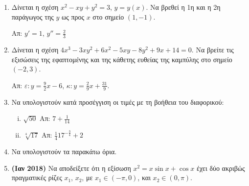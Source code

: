 \begin{enumerate}
\item Δίνεται η σχέση $ x^{2} - xy + y^{2} = 3 $, $ y=y(x) $. Να βρεθεί η 1η
  και η 2η παράγωγος της $y$ ως προς $x$ στο σημείο $ (1,-1) $.

  \hfill Απ: $ y' = 1$, $ y'' = \frac{2}{3} $

\item Δίνεται η σχέση $ 4x^{3} - 3xy^{2} + 6x^{2} - 5xy - 8 y^{2} + 9x + 14
  = 0$. Να βρείτε τις εξισώσεις της εφαπτομένης και της κάθετης ευθείας
  της καμπύλης στο σημείο $ (-2,3) $.

  \hfill Απ: $\varepsilon\colon y = \frac{9}{2} x - 6 $, 
  $\kappa\colon y = \frac{2}{9} x + \frac{31}{9} $.

\item Να υπολογιστούν κατά προσέγγιση οι τιμές με τη βοήθεια του διαφορικού:
  \begin{enumerate}[i)]
    \item $\sqrt{50}$ \hfill Απ: $7+\frac{1}{14}$
    \item $\sqrt[4]{17}$ \hfill Απ: $\frac{1}{4}17^{-\frac{3}{4}}+2$
  \end{enumerate}

\item Να υπολογιστούν τα παρακάτω όρια.
  \begin{enumerate}[(i)]
\end{enumerate}

  \item {\bfseries (Ιαν 2018)} Να αποδείξετε ότι η εξίσωση $ x^{2} = x \sin{x} + \cos{x} $ έχει δύο ακριβώς
    πραγματικές ρίζες $ x_{1} $, $ x_{2} $, με $ x_{1} \in (-\pi, 0) $, και
    $x_{2} \in (0, \pi) $.


\end{enumerate}
